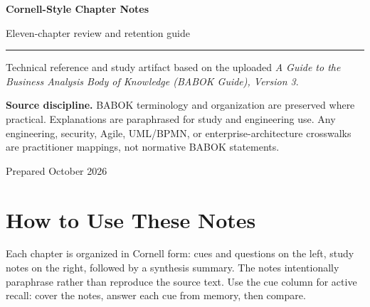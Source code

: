 \documentclass[11pt]{article}
\begin{document}
\begin{titlepage}
\centering
\vspace*{1.15in}
{\Huge\bfseries\color{BANavy} Cornell-Style Chapter Notes\par}
\vspace{0.35in}
{\Large\color{BAOrange} Eleven-chapter review and retention guide\par}
\vspace{0.55in}
\rule{0.78\textwidth}{1.2pt}\par
\vspace{0.35in}
{\large Technical reference and study artifact based on the uploaded \emph{A Guide to the Business Analysis Body of Knowledge (BABOK Guide), Version 3}.\par}
\vfill
\begin{keybox}
\textbf{Source discipline.} BABOK terminology and organization are preserved where practical. Explanations are paraphrased for study and engineering use. Any engineering, security, Agile, UML/BPMN, or enterprise-architecture crosswalks are practitioner mappings, not normative BABOK statements.
\end{keybox}
\vspace{0.35in}
{\small Prepared October 2026\par}
\end{titlepage}
\tableofcontents
\newpage
\section{How to Use These Notes}
Each chapter is organized in Cornell form: cues and questions on the left, study notes on the right, followed by a synthesis summary. The notes intentionally paraphrase rather than reproduce the source text. Use the cue column for active recall: cover the notes, answer each cue from memory, then compare.
\end{document}
